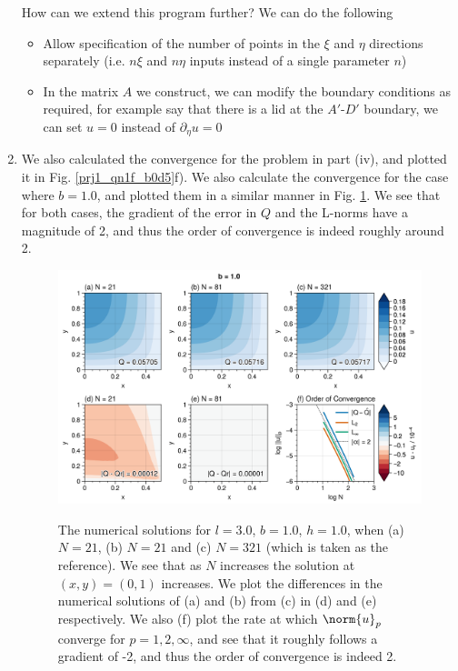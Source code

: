 \begin{enumerate}[label=(\roman*),leftmargin=*,itemsep=0mm]
    How can we extend this program further?  We can do the following
    \begin{itemize}[nolistsep,noitemsep]
        \item Allow specification of the number of points in the $\xi$ and $\eta$ directions separately (i.e. $n\xi$ and $n\eta$ inputs instead of a single parameter $n$)
        \item In the matrix $A$ we construct, we can modify the boundary conditions as required, for example say that there is a lid at the $A'$-$D'$ boundary, we can set $u=0$ instead of $\partial_\eta u = 0$
    \end{itemize}
    
    \item We also calculated the convergence for the problem in part (iv), and plotted it in Fig. \ref{prj1_qn1f_b0d5}f).  We also calculate the convergence for the case where $b=1.0$, and plotted them in a similar manner in Fig. \ref{prj1_qn1f_b1d0}.  We see that for both cases, the gradient of the error in $Q$ and the L-norms have a magnitude of 2, and thus the order of convergence is indeed roughly around 2.

    \begin{figure}[h!]
    \centering
    \includegraphics[width=\textwidth]{figures/prj1_qn1f_b1d0.png}\\
    \caption{The numerical solutions for $l=3.0$, $b=1.0$, $h=1.0$, when (a) $N=21$, (b) $N=21$ and (c) $N=321$ (which is taken as the reference).  We see that as $N$ increases the solution at $(x,y) = (0,1)$ increases.  We plot the differences in the numerical solutions of (a) and (b) from (c) in (d) and (e) respectively.  We also (f) plot the rate at which $\norm{u}_p$ converge for $p = 1,2,\infty$, and see that it roughly follows a gradient of -2, and thus the order of convergence is indeed 2.}
    \label{prj1_qn1f_b1d0}
    \end{figure}
    

\end{enumerate}
